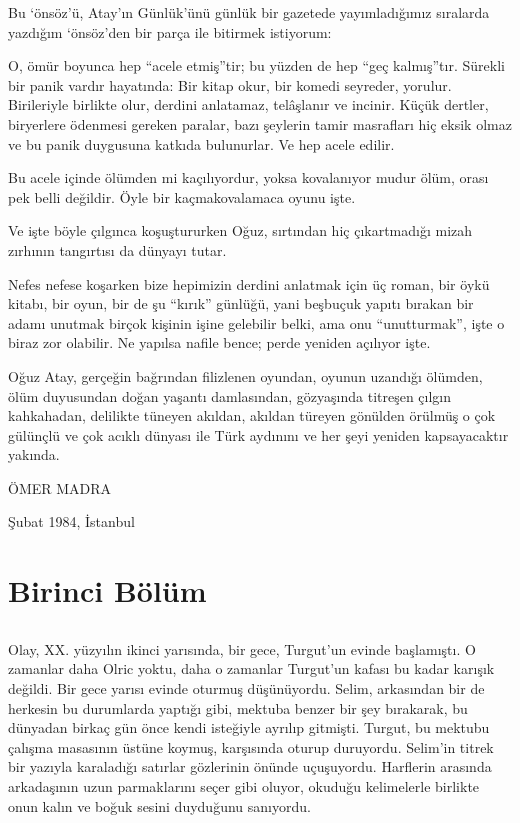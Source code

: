 \documentclass[a5paper,13pt]{scrbook}
\begin{document}
Bu `önsöz'ü, Atay'ın Günlük'ünü günlük bir gazetede yayımladığımız sıralarda
yazdığım `önsöz'den bir parça ile bitirmek istiyorum:

O, ömür boyunca hep ``acele etmiş''tir; bu yüzden de hep ``geç kalmış''tır. Sürekli
bir panik vardır hayatında: Bir kitap okur, bir komedi seyreder, yorulur.
Birileriyle birlikte olur, derdini anlatamaz, telâşlanır ve incinir. Küçük
dertler, biryerlere ödenmesi gereken paralar, bazı şeylerin tamir masrafları hiç
eksik olmaz ve bu panik duygusuna katkıda bulunurlar. Ve hep acele edilir.

Bu acele içinde ölümden mi kaçılıyordur, yoksa kovalanıyor mudur ölüm, orası pek
belli değildir. Öyle bir kaçmakovalamaca oyunu işte.

Ve işte böyle çılgınca koşuştururken Oğuz, sırtından hiç çıkartmadığı mizah
zırhının tangırtısı da dünyayı tutar.

Nefes nefese koşarken bize hepimizin derdini anlatmak için üç roman, bir öykü
kitabı, bir oyun, bir de şu ``kırık'' günlüğü, yani beşbuçuk yapıtı bırakan bir
adamı unutmak birçok kişinin işine gelebilir belki, ama onu ``unutturmak'', işte o
biraz zor olabilir. Ne yapılsa nafile bence; perde yeniden açılıyor işte.

Oğuz Atay, gerçeğin bağrından filizlenen oyundan, oyunun uzandığı ölümden, ölüm
duyusundan doğan yaşantı damlasından, gözyaşında titreşen çılgın kahkahadan,
delilikte tüneyen akıldan, akıldan türeyen gönülden örülmüş o çok gülünçlü ve
çok acıklı dünyası ile Türk aydınını ve her şeyi yeniden kapsayacaktır yakında.

\begin{flushright}
  ÖMER MADRA

  Şubat 1984, İstanbul
\end{flushright}


\part*{Birinci Bölüm}

\chapter{}

Olay, XX. yüzyılın ikinci yarısında, bir gece, Turgut'un evinde başlamıştı. O
zamanlar daha Olric yoktu, daha o zamanlar Turgut'un kafası bu kadar karışık
değildi. Bir gece yarısı evinde oturmuş düşünüyordu. Selim, arkasından bir de
herkesin bu durumlarda yaptığı gibi, mektuba benzer bir şey bırakarak, bu
dünyadan birkaç gün önce kendi isteğiyle ayrılıp gitmişti. Turgut, bu mektubu
çalışma masasının üstüne koymuş, karşısında oturup duruyordu. Selim'in titrek
bir yazıyla karaladığı satırlar gözlerinin önünde uçuşuyordu. Harflerin arasında
arkadaşının uzun parmaklarını seçer gibi oluyor, okuduğu kelimelerle birlikte
onun kalın ve boğuk sesini duyduğunu sanıyordu.
\end{document}
